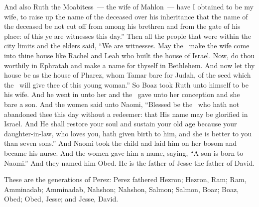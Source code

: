 \begin{inparaenum}
   And also Ruth the Moabitess~--- the wife of Mahlon~--- have I obtained to be my wife, to raise up the name of the deceased over his inheritance that the name of the deceased be not cut off from among his brethren and from the gate of his place: of this ye are witnesses this day.''%
   Then all the people that were within the city limits and the elders said, ``We are witnesses. May the \lord\ make the wife come into thine house like Rachel and Leah who built the house of Israel. Now, do thou worthily in Ephratah and make a name for thyself in Bethlehem.%
   And now let thy house be as the house of Pharez, whom Tamar bare for Judah, of the seed which the \lord\ will give thee of this young woman.''%
   So Boaz took Ruth unto himself to be his wife. And he went in unto her and the \lord\ gave unto her conception and she bare a son.%
   And the women said unto Naomi, ``Blessed be the \lord\ who hath not abandoned thee this day without a redeemer: that His name may be glorified in Israel.%
   And He shall restore your soul and sustain your old age because your daughter-in-law, who loves you, hath given birth to him, and she is better to you than seven sons.''%
   And Naomi took the child and laid him on her bosom and became his nurse.%
   And the women gave him a name, saying, ``A son is born to Naomi.'' And they named him Obed. He is the father of Jesse the father of David.%

   These are the generations of Perez: Perez fathered Hezron;%
   Hezron, Ram; Ram, Amminadab;%
   Amminadab, Nahshon; Nahshon, Salmon;%
   Salmon, Boaz; Boaz, Obed;%
   Obed, Jesse; and Jesse, David.%
\end{inparaenum}
